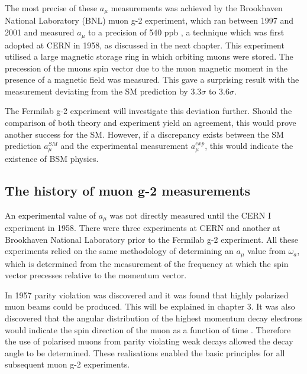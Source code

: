 The most precise of these $a_{\mu}$ measurements was achieved by the Brookhaven National Laboratory (BNL) muon g-2 experiment, which ran between 1997 and 2001 and measured $a_{\mu}$ to a precision of 540 ppb \cite{Reference13}, a technique which was first adopted at CERN in 1958, as discussed in the next chapter. This experiment utilised a large magnetic storage ring in which orbiting muons were stored. The precession of the muons spin vector due to the muon magnetic moment in the presence of a magnetic field was measured. This gave a surprising result with the measurement deviating from the SM prediction by 3.3$\sigma$ to 3.6$\sigma$.

The Fermilab g-2 experiment will investigate this deviation further. Should the comparison of both theory and experiment yield an agreement, this would prove another success for the SM. However, if a discrepancy exists between the SM prediction $a_{\mu}^{SM}$ and the experimental measurement $a_{\mu}^{exp}$, this would indicate the existence of BSM physics.

\subsection{The history of muon g-2 measurements}

An experimental value of $a_{\mu}$ was not directly measured until the CERN I experiment in 1958. There were three experiments at CERN and another at Brookhaven National Laboratory prior to the Fermilab g-2 experiment. All these experiments relied on the same methodology of determining an $a_{\mu}$ value from $\omega_{a}$, which is determined from the measurement of the frequency at which the spin vector precesses relative to the momentum vector.

In 1957 parity violation was discovered and it was found that highly polarized muon beams could be produced. This will be explained in chapter 3. It was also discovered that the angular distribution of the highest momentum decay electrons would indicate the spin direction of the muon as a function of time \cite{Reference9}. 
Therefore the use of polarised muons from parity violating weak decays allowed the decay angle to be determined. These realisations enabled the basic principles for all subsequent muon g-2 experiments. 


